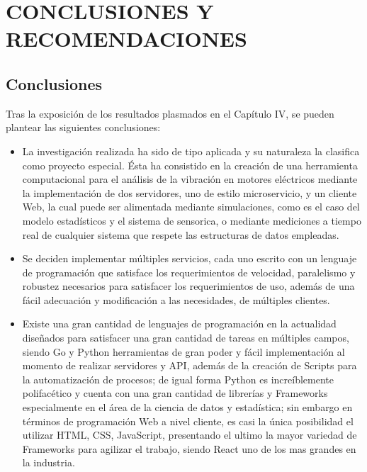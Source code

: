 \thispagestyle{empty}

\section{CONCLUSIONES Y RECOMENDACIONES}
\subsection{Conclusiones}
Tras la exposición de los resultados plasmados en el Capítulo IV, se pueden
plantear las siguientes conclusiones:

\begin{itemize}
    \item La investigación realizada ha sido de tipo aplicada y su naturaleza
        la clasifica como proyecto especial. Ésta ha consistido en la creación
        de una herramienta computacional para el análisis de la vibración en motores
        eléctricos mediante la implementación de dos servidores, uno de estilo
        microservicio, y un cliente Web, la cual puede ser alimentada mediante
        simulaciones, como es el caso del modelo estadísticos y el sistema de
        sensorica, o mediante mediciones a tiempo real de cualquier sistema
        que respete las estructuras de datos empleadas.
    \item Se deciden implementar múltiples servicios, cada uno escrito con un
        lenguaje de programación que satisface los requerimientos de velocidad,
        paralelismo y robustez necesarios para satisfacer los requerimientos de
        uso, además de una fácil adecuación y modificación a las necesidades,
        de múltiples clientes.
    \item Existe una gran cantidad de lenguajes de programación en la actualidad
        diseñados para satisfacer una gran cantidad de tareas en múltiples campos,
        siendo Go y Python herramientas de gran poder y fácil implementación
        al momento de realizar servidores y API, además de la creación de Scripts
        para la automatización de procesos; de igual forma Python es increíblemente
        polifacético y cuenta con una gran cantidad de librerías y Frameworks
        especialmente en el área de la ciencia de datos y estadística; sin embargo
        en términos de programación Web a nivel cliente, es casi la única
        posibilidad el utilizar HTML, CSS, JavaScript, presentando el ultimo la
        mayor variedad de Frameworks para agilizar el trabajo, siendo React uno
        de los mas grandes en la industria.

\end{itemize}
